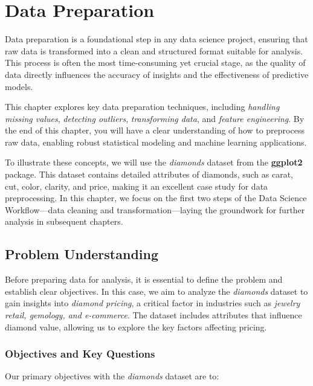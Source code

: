 \documentclass[
  11pt,
]{book}
\theoremstyle{definition}
\theoremstyle{definition}
\theoremstyle{definition}
\theoremstyle{definition}
\theoremstyle{remark}
\begin{document}
\chapter{Data Preparation}\label{chapter-data-prep}

Data preparation is a foundational step in any data science project, ensuring that raw data is transformed into a clean and structured format suitable for analysis. This process is often the most time-consuming yet crucial stage, as the quality of data directly influences the accuracy of insights and the effectiveness of predictive models.

This chapter explores key data preparation techniques, including \emph{handling missing values}, \emph{detecting outliers}, \emph{transforming data}, and \emph{feature engineering}. By the end of this chapter, you will have a clear understanding of how to preprocess raw data, enabling robust statistical modeling and machine learning applications.

To illustrate these concepts, we will use the \emph{diamonds} dataset from the \textbf{ggplot2} package. This dataset contains detailed attributes of diamonds, such as carat, cut, color, clarity, and price, making it an excellent case study for data preprocessing. In this chapter, we focus on the first two steps of the Data Science Workflow---data cleaning and transformation---laying the groundwork for further analysis in subsequent chapters.

\section{Problem Understanding}\label{problem-understanding}

Before preparing data for analysis, it is essential to define the problem and establish clear objectives. In this case, we aim to analyze the \emph{diamonds} dataset to gain insights into \emph{diamond pricing}, a critical factor in industries such as \emph{jewelry retail, gemology, and e-commerce}. The dataset includes attributes that influence diamond value, allowing us to explore the key factors affecting pricing.

\subsection*{Objectives and Key Questions}\label{objectives-and-key-questions}


Our primary objectives with the \emph{diamonds} dataset are to:
\end{document}

